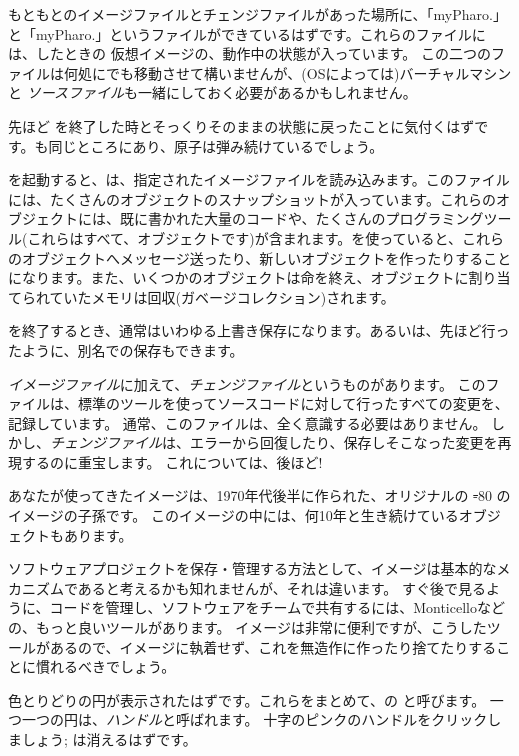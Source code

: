\documentclass[a4paper,10pt,twoside]{book}
\begin{document}
もともとのイメージファイルとチェンジファイルがあった場所に、「myPharo.」と「myPharo.」というファイルができているはずです。これらのファイルには、したときの \pharo 仮想イメージの、動作中の状態が入っています。
この二つのファイルは何処にでも移動させて構いませんが、(OSによっては)バーチャルマシンと \emph{ソースファイル}も一緒にしておく必要があるかもしれません。


先ほど \pharo を終了した時とそっくりそのままの状態に戻ったことに気付くはずです。\bam も同じところにあり、原子は弾み続けているでしょう。

\pharo を起動すると、\pharo {}は、指定されたイメージファイルを読み込みます。このファイルには、たくさんのオブジェクトのスナップショットが入っています。これらのオブジェクトには、既に書かれた大量のコードや、たくさんのプログラミングツール(これらはすべて、オブジェクトです)が含まれます。\pharo を使っていると、これらのオブジェクトへメッセージ送ったり、新しいオブジェクトを作ったりすることになります。また、いくつかのオブジェクトは命を終え、オブジェクトに割り当てられていたメモリは回収(\ie ガベージコレクション)されます。

\pharo を終了するとき、通常はいわゆる上書き保存になります。あるいは、先ほど行ったように、別名での保存もできます。

\emph{イメージファイル}に加えて、\emph{チェンジファイル}というものがあります。
このファイルは、標準のツールを使ってソースコードに対して行ったすべての変更を、記録しています。
通常、このファイルは、全く意識する必要はありません。
しかし、\emph{チェンジファイル}は、エラーから回復したり、保存しそこなった変更を再現するのに重宝します。
これについては、後ほど!

あなたが使ってきたイメージは、1970年代後半に作られた、オリジナルの \st-80 のイメージの子孫です。
このイメージの中には、何10年と生き続けているオブジェクトもあります。

ソフトウェアプロジェクトを保存・管理する方法として、イメージは基本的なメカニズムであると考えるかも知れませんが、それは違います。
すぐ後で見るように、コードを管理し、ソフトウェアをチームで共有するには、Monticelloなどの、もっと良いツールがあります。
イメージは非常に便利ですが、こうしたツールがあるので、イメージに執着せず、これを無造作に作ったり捨てたりすることに慣れるべきでしょう。

色とりどりの円が表示されたはずです。これらをまとめて、\bam の と呼びます。
一つ一つの円は、\emph{ハンドル}と呼ばれます。
十字のピンクのハンドルをクリックしましょう; \bam は消えるはずです。
\end{document}
